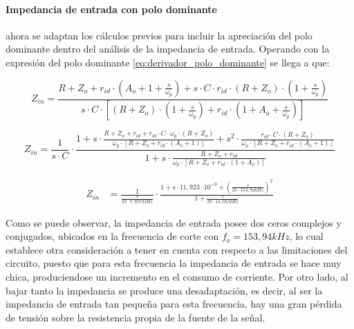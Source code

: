 \paragraph*{Impedancia de entrada con polo dominante} ahora se adaptan los c\'alculos previos para incluir la apreciaci\'on del polo dominante dentro del an\'alisis de la impedancia de entrada. Operando con la expresi\'on del polo dominante \ref{eq:derivador_polo_dominante} se llega a que:

\begin{equation*}
	Z_{in} = \frac{R + Z_o + r_{id} \cdot (A_o + 1 + \frac{s}{\omega_p}) + s \cdot C \cdot r_{id} \cdot (R + Z_o) \cdot (1 + \frac{s}{\omega_p})}{s \cdot C \cdot \left[ (R + Z_o) \cdot (1 + \frac{s}{\omega_p}) + r_{id} \cdot (1 + A_o + \frac{s}{\omega_p}) \right]}
\end{equation*}

\begin{equation*}
	Z_{in} = \frac{1}{s \cdot C} \cdot 
	\frac{1 + s \cdot \frac{R + Z_o + r_{id} + r_{id} \cdot C \cdot \omega_p \cdot(R + Z_o)}{\omega_p \cdot \left[ R + Z_o + r_{id} \cdot (A_o + 1) \right]} + s^{2} \cdot \frac{r_{id} \cdot C \cdot (R + Z_o)}{\omega_p \cdot \left[ R + Z_o + r_{id} \cdot (A_o + 1) \right]}}{1 + s \cdot \frac{R + Z_o + r_{id}}{\omega_p \cdot \left[ R + Z_o + r_{id} \cdot (1 + A_o)\right]}}
\end{equation*}

\begin{align}
	Z_{in} & = \frac{1}{\frac{s}{2 \pi \cdot 7,957MHz}} \cdot
	\frac{1 + s \cdot 11,923 \cdot 10^{-9} + \left(\frac{s}{2 \pi \cdot 153,94kHz}\right)^{2}}{1 + \frac{s}{2 \pi \cdot 14,58MHz}}
	\label{eq:derivador_impedancia_polo_dominante}
\end{align}

Como se puede observar, la impedancia de entrada posee dos ceros complejos y conjugados, ubicados en la frecuencia de corte con $f_o = 153,94kHz$, lo cual establece otra consideración a tener en cuenta con respecto a las limitaciones del circuito, puesto que para esta frecuencia la impedancia de entrada se hace muy chica, produciendose un incremento en el consumo de corriente. Por otro lado, al bajar tanto la impedancia se produce una desadaptaci\'on, es decir, al ser la impedancia de entrada tan peque\~na para esta frecuencia, hay una gran p\'erdida de tensi\'on sobre la resistencia propia de la fuente de la se\~nal.

